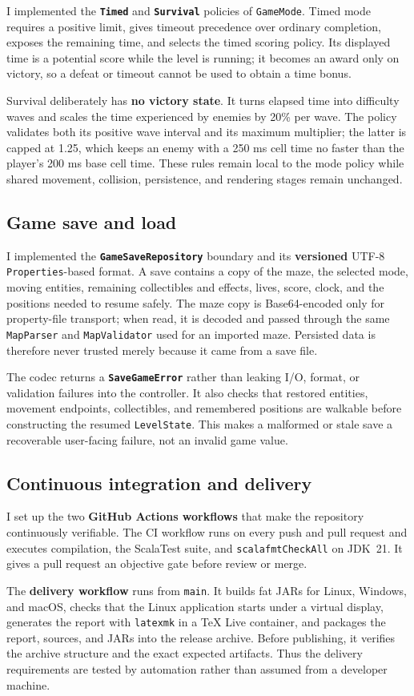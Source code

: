 I implemented the \textbf{\texttt{Timed}} and \textbf{\texttt{Survival}} policies of \texttt{GameMode}. Timed mode requires a positive
limit, gives timeout precedence over ordinary completion, exposes the remaining time, and selects the timed scoring
policy. Its displayed time is a potential score while the level is running; it becomes an award only on victory, so a
defeat or timeout cannot be used to obtain a time bonus.

Survival deliberately has \textbf{no victory state}. It turns elapsed time into difficulty waves and scales the time experienced
by enemies by 20\% per wave. The policy validates both its positive wave interval and its maximum multiplier; the
latter is capped at 1.25, which keeps an enemy with a 250 ms cell time no faster than the player's 200 ms base cell
time. These rules remain local to the mode policy while shared movement, collision, persistence, and rendering stages
remain unchanged.

\subsection{Game save and load}

I implemented the \textbf{\texttt{GameSaveRepository}} boundary and its \textbf{versioned} UTF-8 \texttt{Properties}-based format. A
save contains a copy of the maze, the selected mode, moving entities, remaining collectibles and effects, lives, score,
clock, and the positions needed to resume safely. The maze copy is Base64-encoded only for property-file transport;
when read, it is decoded and passed through the same \texttt{MapParser} and \texttt{MapValidator} used for an imported
maze. Persisted data is therefore never trusted merely because it came from a save file.

The codec returns a \textbf{\texttt{SaveGameError}} rather than leaking I/O, format, or validation failures into the controller.
It also checks that restored entities, movement endpoints, collectibles, and remembered positions are walkable before
constructing the resumed \texttt{LevelState}. This makes a malformed or stale save a recoverable user-facing failure,
not an invalid game value.

\subsection{Continuous integration and delivery}

I set up the two \textbf{GitHub Actions workflows} that make the repository continuously verifiable. The CI workflow runs on
every push and pull request and executes compilation, the ScalaTest suite, and \texttt{scalafmtCheckAll} on JDK~21.
It gives a pull request an objective gate before review or merge.

The \textbf{delivery workflow} runs from \texttt{main}. It builds fat JARs for Linux, Windows, and macOS, checks that the Linux
application starts under a virtual display, generates the report with \texttt{latexmk} in a TeX Live container, and
packages the report, sources, and JARs into the release archive. Before publishing, it verifies the archive structure
and the exact expected artifacts. Thus the delivery requirements are tested by automation rather than assumed from a
developer machine.
